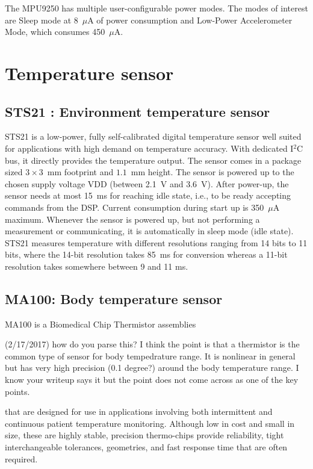 The MPU9250 has multiple user-configurable power modes. The modes of
interest are Sleep mode at 8~$\mu$A of power consumption and
Low-Power Accelerometer Mode, which consumes 450~$\mu$A. 
 
\section{Temperature sensor}

\subsection{ STS21 : Environment temperature sensor}

STS21 is a low-power, fully self-calibrated digital temperature
sensor well suited for applications with high demand on temperature
accuracy. With dedicated I$^2$C bus, it directly provides the
temperature output. The sensor comes in a package sized $3 \times
3$~mm footprint and $1.1$~mm height. The sensor is powered up to the
chosen supply voltage VDD (between 2.1~V and 3.6~V). After power-up,
the sensor needs at most 15~ms for reaching idle state, i.e., to be
ready accepting commands from the DSP. Current consumption during
start up is 350~$\mu$A maximum. Whenever the sensor is powered up,
but not performing a measurement or communicating, it is
automatically in sleep mode (idle state). STS21 measures temperature
with different resolutions ranging from 14 bits to 11 bits, where the
14-bit resolution takes 85~ms for conversion whereas a 11-bit
resolution takes somewhere between 9 and 11 ms.

\subsection{MA100: Body temperature sensor} 

MA100 is a Biomedical Chip Thermistor assemblies
\begin{cmtPai}
	(2/17/2017) how do you parse this?  I think the point is that a
	thermistor is the common type of sensor for body tempedrature
	range.  It is nonlinear in general but has very high precision (0.1
	degree?) around the body temperature range.  I know your writeup
	says it but the point does not come across as one of the key
	points.
\end{cmtPai}
that are designed for use in applications involving both intermittent
and continuous patient temperature monitoring. Although low in cost
and small in size, these are highly stable, precision thermo-chips
provide reliability, tight interchangeable tolerances, geometries,
and fast response time that are often required.
 
